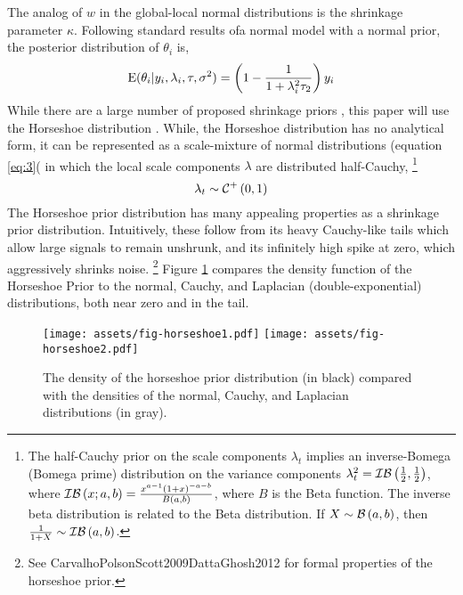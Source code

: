 \documentclass{article}
\begin{document}
The analog of $w$ in the global-local normal distributions is the shrinkage parameter $\kappa$.
Following standard results ofa normal model with a normal prior, the posterior distribution of $\theta_{i}$ is,
\begin{equation}
  \label{eq:11}
  \operatorname{E} (\theta_{i} | y_{i}, \lambda_{i}, \tau, \sigma^{2}) = \left(1 - \frac{1}{1 + \lambda^{2}_{i} \tau_{2}} \right) y_{i}
\end{equation}
While there are a large number of proposed shrinkage priors \parencites{ArmaganDunsonLee2011}{BrownGriffin2010}{PolsonScott2010}, this paper will use the Horseshoe distribution \parencites{CarvalhoPolsonScott2009}{CarvalhoPolsonScott2010}{PolsonScott2010}{PolsonScott2012}{DattaGhosh2012}.
While, the Horseshoe distribution has no analytical form, it can be represented as a scale-mixture of normal distributions (equation \eqref{eq:3}( in which the local scale components $\lambda$ are distributed half-Cauchy,%
\footnote{
The half-Cauchy prior on the scale components $\lambda_{t}$ implies an inverse-Bomega (Bomega prime) distribution on the variance components $\lambda_{t}^{2} = \mathcal{IB}\left(\frac{1}{2}, \frac{1}{2}\right)$, where $\mathcal{IB}\left(x; a, b\right) = \frac{x^{a - 1} (1 + x)^{-a - b}}{B(a, b)}$, where $B$ is the Beta function.
The inverse beta distribution is related to the Beta distribution.
If $X \sim \mathcal{B}\left(a, b\right)$, then $\frac{1}{1 + X} \sim \mathcal{IB}\left(a, b\right)$.
}
\begin{equation}
  \label{eq:6}
  \lambda_{t} \sim \mathcal{C}^{+}\left(0, 1\right)
\end{equation}
The Horseshoe prior distribution has many appealing properties as a shrinkage prior distribution.
Intuitively, these follow from its heavy Cauchy-like tails which allow large signals to remain unshrunk, and its infinitely high spike at zero, which aggressively shrinks noise.
\footnote{See \textcite{CarvalhoPolsonScott2010}{CarvalhoPolsonScott2009}{DattaGhosh2012} for formal properties of the horseshoe prior.}
Figure \ref{fig:horseshoe} compares the density function of the Horseshoe Prior to the normal, Cauchy, and Laplacian (double-exponential) distributions, both near zero and in the tail.
\begin{figure}
  \centering
  \texttt{[image: assets/fig-horseshoe1.pdf]}
  \texttt{[image: assets/fig-horseshoe2.pdf]}
  \caption{The density of the horseshoe prior distribution (in black) compared with the densities of the normal, Cauchy, and Laplacian distributions (in gray).}
  \label{fig:horseshoe}
\end{figure}
\end{document}
